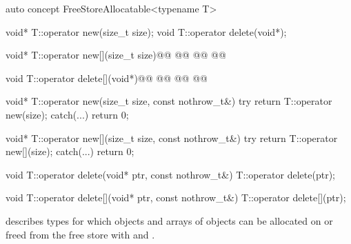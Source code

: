 \documentclass[american,twoside]{book}
\begin{document}
\begin{itemdescr}
\pnum
{}

\pnum
{}
\end{itemdescr}

\color{black}

\setcounter{section}{8}
\setcounter{Paras}{1}
\begin{itemdecl}
auto concept FreeStoreAllocatable<typename T> {
  void* T::operator new(size_t size);
  void T::operator delete(void*);

  void* T::operator new[](size_t size)@\removedConcepts{;}@ @\addedConcepts{\{}@
    @@
  @\addedConcepts{\}}@

  void T::operator delete[](void*)@\removedConcepts{;}@ @\addedConcepts{\{}@
    @@
  @\addedConcepts{\}}@

  void* T::operator new(size_t size, const nothrow_t&) { 
    try { 
      return T::operator new(size); 
    } catch(...) { 
      return 0; 
    } 
  } 

  void* T::operator new[](size_t size, const nothrow_t&) { 
    try { 
      return T::operator new[](size); 
    } catch(...) { 
      return 0; 
    } 
  } 

  void T::operator delete(void* ptr, const nothrow_t&) { 
    T::operator delete(ptr); 
  } 

  void T::operator delete[](void* ptr, const nothrow_t&) { 
    T::operator delete[](ptr); 
  } 
}
\end{itemdecl}

\begin{itemdescr}
\pnum
\mbox{\reallynote} describes types for which objects and
arrays of objects can be allocated on or freed from the free store with
\mbox{} and \mbox{}.
\end{itemdescr}
\end{document}

